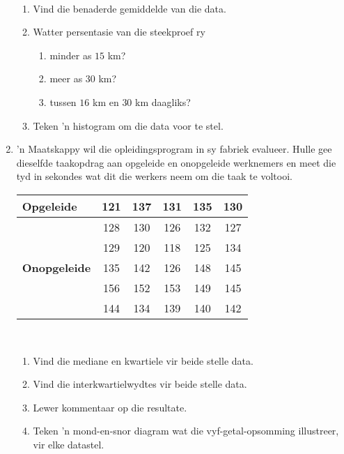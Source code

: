 \begin{eocexercises}{}
\begin{enumerate}[itemsep=6pt, label=\textbf{\arabic*}.]
\begin{center}
\begin{tabular}{|c|c|}
      \end{tabular}
    \end{center}
\vspace {8pt}\\
     \begin{enumerate}[noitemsep, label=\textbf{(\alph*)} ]
    \item Vind die benaderde gemiddelde van die data.
    \item Watter persentasie van die steekproef ry 
      \begin{enumerate}[noitemsep, label=\textbf{\roman*}. ]
      \item minder as $15$ km?
      \item meer as $30$ km?
      \item tussen $16$ km en $30$ km daagliks?
      \end{enumerate}
\item Teken 'n histogram om die data voor te stel.
    \end{enumerate}

  \item ’n Maatskappy wil die opleidingsprogram in sy fabriek evalueer. Hulle gee dieselfde taakopdrag aan opgeleide en onopgeleide werknemers en meet die tyd in sekondes wat  dit die werkers neem om die taak te voltooi. 
\\
    \begin{center}
      \begin{tabular}{|l|c|c|c|c|c|} \hline

        \textbf{Opgeleide} & 121 & 137 & 131 & 135 & 130 \\ \hline
                         & 128 & 130 & 126 & 132 & 127 \\\hline
                         & 129 & 120 & 118 & 125 & 134 \\\hline

        \textbf{Onopgeleide} & 135 & 142 & 126 & 148 & 145 \\\hline
                           & 156 & 152 & 153 & 149 & 145 \\\hline
                           & 144 & 134 & 139 & 140 & 142 \\\hline

      \end{tabular}
    \end{center}
\vspace {8pt}\\
    \begin{enumerate}[noitemsep, label=\textbf{(\alph*)} ]
    \item Vind die mediane en kwartiele vir beide stelle data.
    \item Vind die interkwartielwydtes vir beide stelle data.
    \item Lewer kommentaar op die resultate.
\item Teken 'n mond-en-snor diagram wat die vyf-getal-opsomming illustreer, vir elke datastel.
    \end{enumerate}


\end{enumerate}
\end{eocexercises}

